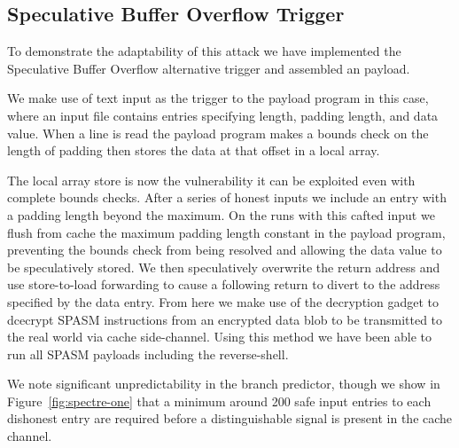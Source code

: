 
\subsection{Speculative Buffer Overflow Trigger}
\label{subsec:sbo-impl}


To demonstrate the adaptability of this attack we have implemented the 
Speculative Buffer Overflow alternative trigger and assembled an \speculake 
payload. 

We make use of text input as the trigger to the payload program in this case,
where an input file contains entries specifying length, padding length,
and data value. When a line is read the payload program makes a bounds
check on the length of padding then stores the data at that offset in a
local array. 

The local array store is now the vulnerability it can be exploited even 
with complete bounds checks. After a series of honest inputs we include 
an entry with a padding length beyond the maximum. On the runs with this
cafted input we flush from cache the maximum padding length constant in 
the payload program, preventing the bounds check from being resolved 
and allowing the data value to be speculatively stored. We 
then speculatively overwrite the return address and use store-to-load forwarding
to cause a following return to divert to the address specified by the data entry. 
From here we make use of the decryption gadget to dcecrypt SPASM instructions
from an encrypted data blob to be transmitted to the real world via cache 
side-channel. Using this method we have been able to run all SPASM payloads 
including the reverse-shell. 

We note significant unpredictability in the branch predictor, though we
show in Figure~\ref{fig:spectre-one} that a minimum around 200 safe input entries
to each dishonest entry are required before a distinguishable signal is present 
in the cache channel. 
\fi
